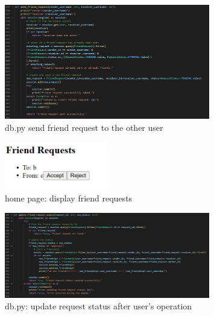 \documentclass[12pt]{article}
\begin{document}
\begin{enumerate}
		\begin{figure}[H]
                \centering
                \includegraphics[width=0.8\textwidth]{zzrgraphs/db_send_friend_request.png}
                \caption{db.py send friend request to the other user}
                \label{sendfriendrequest}
            \end{figure}

		\begin{figure}[H]
                \centering
                \includegraphics[width=0.4\textwidth]{zzrgraphs/display_friendrequests.png}
                \caption{home page: display friend requests}
                \label{twobuttons}
            \end{figure}

		\begin{figure}[H]
                \centering
                \includegraphics[width=0.8\textwidth]{zzrgraphs/db_update_request_status.png}
                \caption{db.py: update request status after user's operation}
                \label{updatestatus}
            \end{figure}


\end{enumerate}
\end{document}
